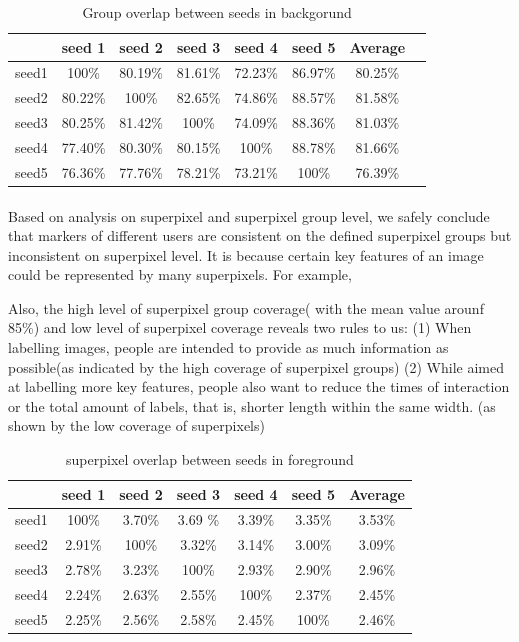 \documentclass[runningheads,a4paper]{llncs}
\begin{document}
\begin{table}
\centering
\begin{tabular}{|c|c|c|c|c|c|c|c|}
\hline
 & seed 1 & seed 2&seed 3&seed 4&seed 5&Average\\
\hline
seed1& 100\% &80.19\% & 81.61\%& 72.23\%& 86.97\%&80.25\%\\
\hline
seed2& 80.22\% & 100\% & 82.65\%& 74.86\%& 88.57\%&81.58\% \\
\hline
seed3& 80.25\% & 81.42\% & 100\%& 74.09\%& 88.36\%&81.03\%\\
\hline
seed4& 77.40\% & 80.30\% & 80.15\%& 100\%& 88.78\%&81.66\% \\
\hline
seed5& 76.36\% & 77.76\% & 78.21\%& 73.21\%& 100\%&76.39\%\\
\hline
\end{tabular}
\caption{Group overlap between seeds in backgorund}
\label{ta: group overlap b}
\end{table} 


\paragraph{}Based on analysis on superpixel and superpixel group level, we safely conclude that markers of different users are consistent on the defined superpixel groups but inconsistent on superpixel level. It is because certain key features of an image could be represented by many superpixels. For example, 



Also, the high level of superpixel group coverage( with the mean value arounf 85\%) and low level of superpixel coverage reveals two rules to us: (1) When labelling images, people are intended to provide as much information as possible(as indicated by the high coverage of superpixel groups)  (2) While aimed at labelling more key features, people also want to reduce the times of interaction or the total amount of labels, that is, shorter length within the same width. (as shown by the low coverage of superpixels)




\begin{table}
\centering
\begin{tabular}{|c|c|c|c|c|c|c|}
\hline
 & seed 1 & seed 2&seed 3&seed 4&seed 5&Average\\
\hline
seed1& 100\% & 3.70\% & 3.69	\%& 3.39\%& 3.35\%& 3.53\%\\
\hline
seed2& 2.91\% & 100\% & 3.32\%& 3.14\%& 3.00\% & 3.09\%\\
\hline
seed3& 2.78\% & 3.23\% & 100\%& 2.93\%& 2.90\%& 2.96\% \\
\hline
seed4& 2.24\% & 2.63\% & 2.55\%& 100\%& 2.37\%& 2.45\%\\
\hline
seed5& 2.25\% & 2.56\% & 2.58\%& 2.45\%& 100\%& 2.46\% \\
\hline
\end{tabular}
\caption{superpixel overlap between seeds in foreground }
\label{ta: sp overlap f}
\end{table} 
\end{document}
